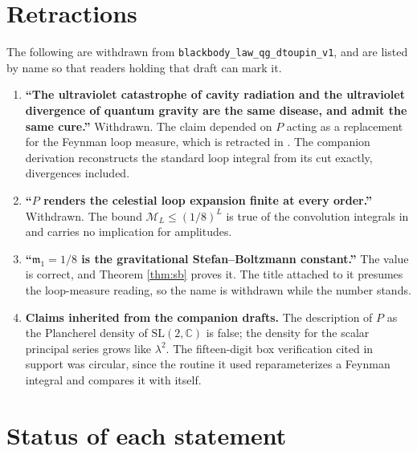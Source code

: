 \documentclass[12pt,a4paper]{article}
\theoremstyle{plain}
\theoremstyle{definition}
\theoremstyle{remark}
\newcommand{\C}{\mathbb{C}}
\newcommand{\mm}{\mathfrak{m}}
\newcommand{\cM}{\mathcal{M}}
\begin{document}
\section{Retractions}
\label{sec:retract}

The following are withdrawn from
\texttt{blackbody\_law\_qg\_dtoupin\_v1}, and are listed by name so
that readers holding that draft can mark it.

\begin{enumerate}
\item \textbf{``The ultraviolet catastrophe of cavity radiation and the
ultraviolet divergence of quantum gravity are the same disease, and
admit the same cure.''} Withdrawn. The claim depended on $P$ acting as
a replacement for the Feynman loop measure, which is retracted in
\cite{ToupinSpectral}. The companion derivation \cite{ToupinLoops}
reconstructs the standard loop integral from its cut exactly,
divergences included.

\item \textbf{``$P$ renders the celestial loop expansion finite at
every order.''} Withdrawn. The bound $\cM_L\le(1/8)^L$ is true of the
convolution integrals in \cite{ToupinSpectral} and carries no
implication for amplitudes.

\item \textbf{``$\mm_1=1/8$ is the gravitational Stefan--Boltzmann
constant.''} The value is correct, and Theorem \ref{thm:sb} proves it.
The title attached to it presumes the loop-measure reading, so the name
is withdrawn while the number stands.

\item \textbf{Claims inherited from the companion drafts.} The
description of $P$ as the Plancherel density of $\mathrm{SL}(2,\C)$ is
false; the density for the scalar principal series grows like
$\lambda^2$. The fifteen-digit box verification cited in support was
circular, since the routine it used reparameterizes a Feynman integral
and compares it with itself.
\end{enumerate}

\section{Status of each statement}
\end{document}
